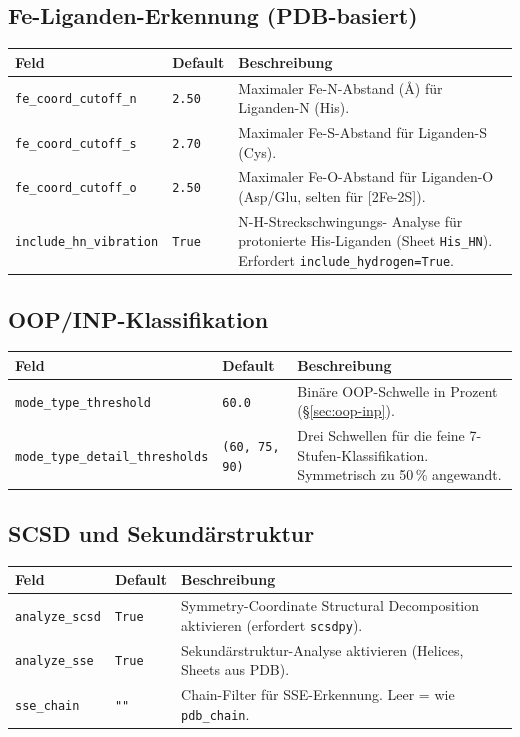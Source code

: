 \documentclass[11pt,a4paper,twoside]{article}
\theoremstyle{remark}
\begin{document}
\subsection{Fe-Liganden-Erkennung (PDB-basiert)}

\begin{longtable}{p{} p{} p{}}
\toprule
\textbf{Feld} & \textbf{Default} & \textbf{Beschreibung} \\
\midrule
\endhead
\texttt{fe\_coord\_cutoff\_n} & \texttt{2.50} & Maximaler Fe-N-Abstand
  (\AA{}) f\"ur Liganden-N (His). \\
\texttt{fe\_coord\_cutoff\_s} & \texttt{2.70} & Maximaler Fe-S-Abstand
  f\"ur Liganden-S (Cys). \\
\texttt{fe\_coord\_cutoff\_o} & \texttt{2.50} & Maximaler Fe-O-Abstand
  f\"ur Liganden-O (Asp/Glu, selten f\"ur {[}2Fe-2S{]}). \\
\texttt{include\_hn\_vibration} & \texttt{True} & N-H-Streckschwingungs-
  Analyse f\"ur protonierte His-Liganden (Sheet \texttt{His\_HN}).
  Erfordert \texttt{include\_hydrogen=True}. \\
\bottomrule
\end{longtable}

\subsection{OOP/INP-Klassifikation}

\begin{longtable}{p{} p{} p{}}
\toprule
\textbf{Feld} & \textbf{Default} & \textbf{Beschreibung} \\
\midrule
\endhead
\texttt{mode\_type\_threshold} & \texttt{60.0} & Bin\"are OOP-Schwelle in
  Prozent (\S\ref{sec:oop-inp}). \\
\texttt{mode\_type\_detail\_thresholds} & \texttt{(60, 75, 90)} & Drei
  Schwellen f\"ur die feine 7-Stufen-Klassifikation. Symmetrisch zu 50\,\%
  angewandt. \\
\bottomrule
\end{longtable}

\subsection{SCSD und Sekund\"arstruktur}

\begin{longtable}{p{} p{} p{}}
\toprule
\textbf{Feld} & \textbf{Default} & \textbf{Beschreibung} \\
\midrule
\endhead
\texttt{analyze\_scsd}  & \texttt{True} & Symmetry-Coordinate
  Structural Decomposition aktivieren (erfordert \texttt{scsdpy}). \\
\texttt{analyze\_sse}    & \texttt{True} & Sekund\"arstruktur-Analyse
  aktivieren (Helices, Sheets aus PDB). \\
\texttt{sse\_chain}      & \texttt{""}   & Chain-Filter f\"ur
  SSE-Erkennung. Leer = wie \texttt{pdb\_chain}. \\
\bottomrule
\end{longtable}
\end{document}
